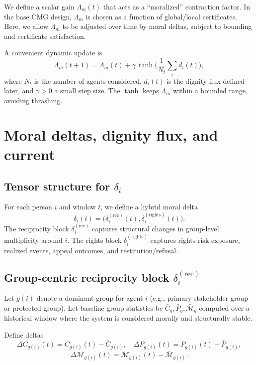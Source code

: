 \documentclass[11pt]{article}
\begin{document}
We define a scalar gain \(\Lambda_m(t)\) that acts as a ``moralized'' contraction factor.
In the base CMG design, \(\Lambda_m\) is chosen as a function of global/local certificates.\cite{cmg-spec}
Here, we allow \(\Lambda_m\) to be adjusted over time by moral deltas, subject to bounding and certificate satisfaction.

A convenient dynamic update is
\[
\Lambda_m(t+1) = \Lambda_m(t) + \gamma \,\tanh\!\Big(\frac{1}{N_t}\sum_{i} d_i(t)\Big),
\]
where \(N_t\) is the number of agents considered, \(d_i(t)\) is the dignity flux defined later, and \(\gamma>0\) a small step size.
The \(\tanh\) keeps \(\Lambda_m\) within a bounded range, avoiding thrashing.

\section{Moral deltas, dignity flux, and current}

\subsection{Tensor structure for \texorpdfstring{\(\delta_i\)}{delta\_i}}

For each person \(i\) and window \(t\), we define a hybrid moral delta
\[
\delta_i(t) = \big(\delta_i^{(\text{rec})}(t), \delta_i^{(\text{rights})}(t)\big).
\]
The reciprocity block \(\delta_i^{(\text{rec})}\) captures structural changes in group-level multiplicity around \(i\).
The rights block \(\delta_i^{(\text{rights})}\) captures rights-risk exposure, realized events, appeal outcomes, and restitution/refusal.

\subsection{Group-centric reciprocity block \texorpdfstring{\(\delta_i^{(\text{rec})}\)}{delta\_i\^rec}}

Let \(g(i)\) denote a dominant group for agent \(i\) (e.g., primary stakeholder group or protected group).
Let baseline group statistics be \(\bar{C}_{g}, \bar{P}_{g}, \bar{\mathcal{M}}_{g}\) computed over a historical window where the system is considered morally and structurally stable.

Define deltas
\[
\Delta C_{g(i)}(t) = C_{g(i)}(t) - \bar{C}_{g(i)},\quad
\Delta P_{g(i)}(t) = P_{g(i)}(t) - \bar{P}_{g(i)},
\]
\[
\Delta \mathcal{M}_{g(i)}(t) = \mathcal{M}_{g(i)}(t) - \bar{\mathcal{M}}_{g(i)}.
\]
\end{document}
